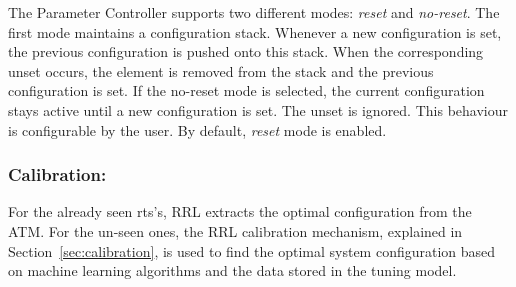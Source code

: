 The Parameter Controller supports two different modes: \textit{reset} and \textit{no-reset}. The first mode maintains a configuration stack. Whenever a new configuration is set, the previous configuration is pushed onto this stack. When the corresponding unset occurs, the element is removed from the stack and the previous configuration is set. If the no-reset mode is selected, the current configuration stays active until a new configuration is set. The unset is ignored. This behaviour is configurable by the user. By default, \textit{reset} mode is enabled.

\subsubsection{Calibration:} For the already seen rts's, RRL extracts the optimal configuration from the ATM. For the un-seen ones, the RRL calibration mechanism, explained in Section~\ref{sec:calibration}, is used to find the optimal system configuration based on machine learning algorithms and the data stored in the tuning model. 

 